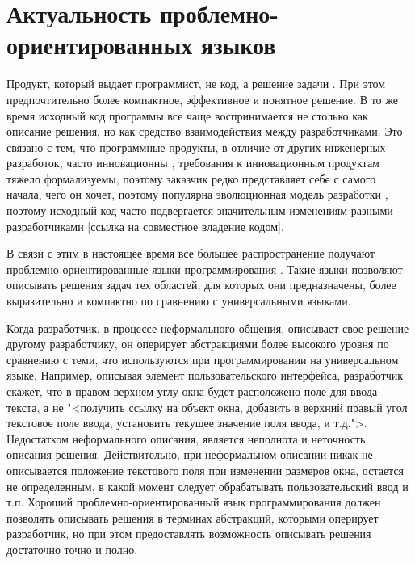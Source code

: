 \section{Актуальность проблемно-ориентированных языков}
Продукт, который выдает программист, не код, а решение задачи \cite{dmitriev}. При этом предпочтительно более компактное, эффективное и понятное решение. В то же время исходный код программы все чаще воспринимается не столько как описание решения, но как средство взаимодействия между разработчиками. Это связано с тем, что программные продукты, в отличие от других инженерных разработок, часто инновационны \cite{brooks}, требования к инновационным продуктам тяжело формализуемы, поэтому заказчик редко представляет себе с самого начала, чего он хочет, поэтому популярна эволюционная модель разработки \cite{gost12207-99,evolutionModel}, поэтому исходный код часто подвергается значительным изменениям разными разработчиками [ссылка на совместное владение кодом].

В связи с этим в настоящее время все большее распространение получают проблемно-ориентированные языки программирования \cite{fowler01}. Такие языки позволяют описывать решения задач тех областей, для которых они предназначены, более выразительно и компактно по сравнению с универсальными языками.

Когда разработчик, в процессе неформального общения, описывает свое решение другому разработчику, он оперирует абстракциями более высокого уровня по сравнению с теми, что используются при программировании на универсальном языке. Например, описывая элемент пользовательского интерфейса, разработчик скажет, что в правом верхнем углу окна будет расположено поле для ввода текста, а не "<получить ссылку на объект окна, добавить в верхний правый угол текстовое поле ввода, установить текущее значение поля ввода, и т.д.">. Недостатком неформального описания, является неполнота и неточность описания решения. Действительно, при неформальном описании никак не описывается положение текстового поля при изменении размеров окна, остается не определенным, в какой момент следует обрабатывать пользовательский ввод и т.п. Хороший проблемно-ориентированный язык программирования должен позволять описывать решения в терминах абстракций, которыми оперирует разработчик, но при этом предоставлять возможность описывать решения достаточно точно и полно.
